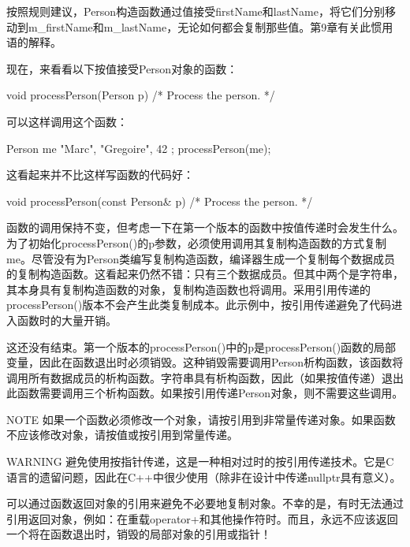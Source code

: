 按照规则建议，Person构造函数通过值接受firstName和lastName，将它们分别移动到m\_firstName和m\_lastName，无论如何都会复制那些值。第9章有关此惯用语的解释。

现在，来看看以下按值接受Person对象的函数：

\begin{cpp}
void processPerson(Person p) { /* Process the person. */ }
\end{cpp}

可以这样调用这个函数：

\begin{cpp}
Person me { "Marc", "Gregoire", 42 };
processPerson(me);
\end{cpp}

这看起来并不比这样写函数的代码好：

\begin{cpp}
void processPerson(const Person& p) { /* Process the person. */ }
\end{cpp}

函数的调用保持不变，但考虑一下在第一个版本的函数中按值传递时会发生什么。为了初始化processPerson()的p参数，必须使用调用其复制构造函数的方式复制me。尽管没有为Person类编写复制构造函数，编译器生成一个复制每个数据成员的复制构造函数。这看起来仍然不错：只有三个数据成员。但其中两个是字符串，其本身具有复制构造函数的对象，复制构造函数也将调用。采用引用传递的processPerson()版本不会产生此类复制成本。此示例中，按引用传递避免了代码进入函数时的大量开销。

这还没有结束。第一个版本的processPerson()中的p是processPerson()函数的局部变量，因此在函数退出时必须销毁。这种销毁需要调用Person析构函数，该函数将调用所有数据成员的析构函数。字符串具有析构函数，因此（如果按值传递）退出此函数需要调用三个析构函数。如果按引用传递Person对象，则不需要这些调用。

\begin{myNotic}{NOTE}
如果一个函数必须修改一个对象，请按引用到非常量传递对象。如果函数不应该修改对象，请按值或按引用到常量传递。
\end{myNotic}

\begin{myWarning}{WARNING}
避免使用按指针传递，这是一种相对过时的按引用传递技术。它是C语言的遗留问题，因此在C++中很少使用（除非在设计中传递nullptr具有意义）。
\end{myWarning}


可以通过函数返回对象的引用来避免不必要地复制对象。不幸的是，有时无法通过引用返回对象，例如：在重载operator+和其他操作符时。而且，永远不应该返回一个将在函数退出时，销毁的局部对象的引用或指针！

